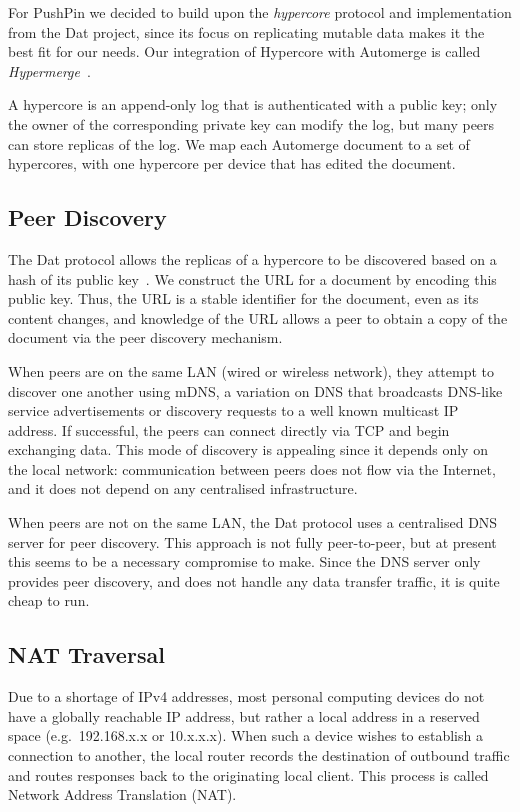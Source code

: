 \documentclass[sigplan,10pt]{acmart}
\begin{document}
For PushPin we decided to build upon the \emph{hypercore} protocol and implementation from the Dat project, since its focus on replicating mutable data makes it the best fit for our needs.
Our integration of Hypercore with Automerge is called \emph{Hypermerge}~\cite{Hypermerge}.

A hypercore is an append-only log that is authenticated with a public key; only the owner of the corresponding private key can modify the log, but many peers can store replicas of the log.
We map each Automerge document to a set of hypercores, with one hypercore per device that has edited the document.

\subsection{Peer Discovery}\label{sec:peer-discovery}

The Dat protocol allows the replicas of a hypercore to be discovered based on a hash of its public key~\cite{HowDatWorks}.
We construct the URL for a document by encoding this public key.
Thus, the URL is a stable identifier for the document, even as its content changes, and knowledge of the URL allows a peer to obtain a copy of the document via the peer discovery mechanism.

When peers are on the same LAN (wired or wireless network), they attempt to discover one another using mDNS, a variation on DNS that broadcasts DNS-like service advertisements or discovery requests to a well known multicast IP address.
If successful, the peers can connect directly via TCP and begin exchanging data.
This mode of discovery is appealing since it depends only on the local network: communication between peers does not flow via the Internet, and it does not depend on any centralised infrastructure.

When peers are not on the same LAN, the Dat protocol uses a centralised DNS server for peer discovery.
This approach is not fully peer-to-peer, but at present this seems to be a necessary compromise to make.
Since the DNS server only provides peer discovery, and does not handle any data transfer traffic, it is quite cheap to run.

\subsection{NAT Traversal}\label{sec:nat-traversal}

Due to a shortage of IPv4 addresses, most personal computing devices do not have a globally reachable IP address, but rather a local address in a reserved space (e.g.\ 192.168.x.x or 10.x.x.x).
When such a device wishes to establish a connection to another, the local router records the destination of outbound traffic and routes responses back to the originating local client.
This process is called Network Address Translation (NAT).
\end{document}
